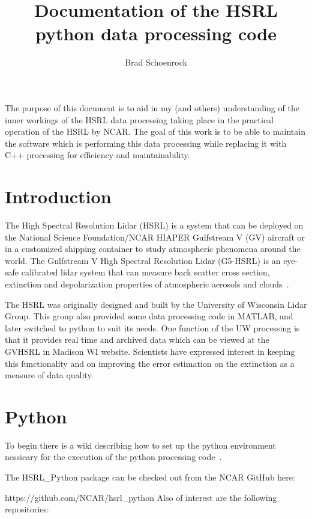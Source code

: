 \documentclass[a4paper,12pt]{article}
\begin{document}
\author{Brad Schoenrock} 
\title{Documentation of the HSRL python data processing code}
\maketitle

The purpose of this document is to aid in my (and others) understanding of the inner workings of the HSRL data processing taking place in the practical operation of the HSRL by NCAR. The goal of this work is to be able to maintain the software which is performing this data processing while replacing it with C++ processing for efficiency and maintainability.

\section{Introduction}
\label{SECTION-Introduction}

The High Spectral Resolution Lidar (HSRL) is a system that can be deployed on the National Science Foundation/NCAR HIAPER Gulfstream V (GV) aircraft or in a customized shipping container to study atmospheric phenomena around the world. The Gulfstream V High Spectral Resolution Lidar (G5-HSRL) is an eye-safe calibrated lidar system that can measure back scatter cross section, extinction and depolarization properties of atmospheric aerosols and clouds~\cite{HSRLpage}.

The HSRL was originally designed and built by the University of Wisconsin Lidar Group. This group also provided some data processing code in MATLAB, and later switched to python to suit its needs. One function of the UW processing is that it provides real time and archived data which can be viewed at the GVHSRL in Madison WI website. Scientists have expressed interest in keeping this functionality and on improving the error estimation on the extinction as a measure of data quality. 

\section{Python}
\label{SECTION-python}

To begin there is a wiki describing how to set up the python environment nessicary for the execution of the python processing code~\cite{PythonEnvWiki}. 


The HSRL\_Python package can be checked out from the NCAR GitHub here: 

https://github.com/NCAR/hsrl\_python
\newline
\newline
Also of interest are the following repositories: 
\end{document}
